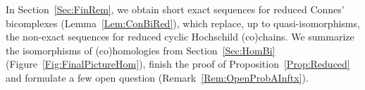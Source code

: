 \documentclass[\MainFolder/Text.tex]{subfiles}
\begin{document}
In Section~\ref{Sec:FinRem}, we obtain short exact sequences for reduced Connes' bicomplexes (Lemma~\ref{Lem:ConBiRed}), which replace, up to quasi-isomorphisms, the non-exact sequences for reduced cyclic Hochschild (co)chains. We summarize the isomorphisms of (co)homologies from Section~\ref{Sec:HomBi} (Figure~\ref{Fig:FinalPictureHom}), finish the proof of Proposition~\ref{Prop:Reduced} and formulate a few open question (Remark~\ref{Rem:OpenProbAInftx}).
%
%
%
%
%
%
\end{document}
